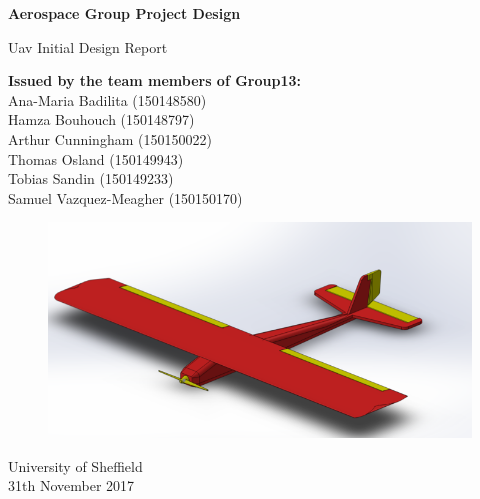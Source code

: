 \documentclass[12pt]{article}
\begin{document}
\setmainfont{Times New Roman}
\begin{titlepage}
    \begin{center}
        \vspace*{1cm}
        
        \textbf{\Huge{Aerospace Group Project Design}}
        
        \vspace{0.5cm}
        \LARGE{Uav Initial Design Report}
        
        \vspace{1.5cm}
        
        \normalsize{\textbf{Issued by the team members of Group13:}\\
        Ana-Maria Badilita (150148580)\\
        Hamza Bouhouch (150148797)\\
        Arthur Cunningham (150150022)\\
        Thomas Osland (150149943)\\
        Tobias Sandin (150149233)\\
        Samuel Vazquez-Meagher (150150170)}

        \vfill

        \begin{figure}[h!]
            \includegraphics[width=15cm]{allplane.png}
        \end{figure}
        
        \vspace{0.8cm}
        
        University of Sheffield\\
        31th November 2017
        
    \end{center}
\end{titlepage}

\newpage
\end{document}
